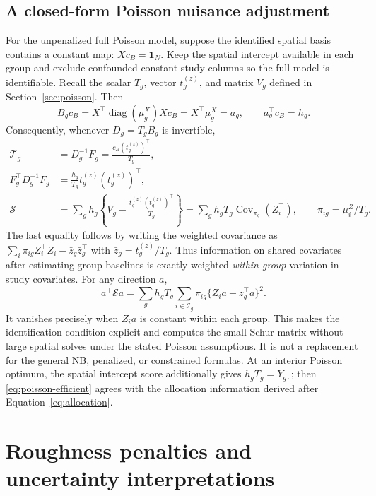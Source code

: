 \documentclass[11pt,a4paper]{article}
\newcommand{\Cov}{\operatorname{Cov}}
\newcommand{\diag}{\operatorname{diag}}
\numberwithin{equation}{section}
\begin{document}
\subsection{A closed-form Poisson nuisance adjustment}
For the unpenalized full Poisson model, suppose the identified spatial
basis contains a constant map: $Xc_B=\mathbf1_N$.
Keep the spatial intercept available in each group and exclude
confounded constant study columns so the full model is identifiable.
Recall the scalar $T_g$, vector $t_g^{(z)}$, and matrix $V_g$
defined in Section~\ref{sec:poisson}. Then
\[
 B_gc_B=X^\top\diag(\mu_g^X)Xc_B
       =X^\top\mu_g^X=a_g,\qquad a_g^\top c_B=h_g.
\]
Consequently, whenever $D_g=T_gB_g$ is invertible,
\begin{align}
 \mathcal T_g
 &=D_g^{-1}F_g
   =\frac{c_B(t_g^{(z)})^\top}{T_g},\\
 F_g^\top D_g^{-1}F_g
 &=\frac{h_g}{T_g}t_g^{(z)}(t_g^{(z)})^\top,\\
 \mathcal S
 &=\sum_g h_g\left\{V_g-
       \frac{t_g^{(z)}(t_g^{(z)})^\top}{T_g}\right\}
   =\sum_g h_gT_g\Cov_{\pi_g}(Z_i^\top),
 \qquad \pi_{ig}=\mu_i^Z/T_g .
 \label{eq:poisson-efficient}
\end{align}
The last equality follows by writing the weighted covariance as
$\sum_i\pi_{ig}Z_i^\top Z_i-\bar z_g\bar z_g^\top$ with
$\bar z_g=t_g^{(z)}/T_g$.
Thus information on shared covariates after estimating group baselines
is exactly weighted \emph{within-group} variation in study covariates.
For any direction $a$,
\[
 a^\top\mathcal S a
  =\sum_g h_gT_g\sum_{i\in\mathcal I_g}
      \pi_{ig}\{Z_i a-\bar z_g^\top a\}^2.
\]
It vanishes precisely when $Z_i a$ is constant within each group.
This makes the identification condition explicit and computes the
small Schur matrix without large spatial solves under the stated
Poisson assumptions.
It is not a replacement for the general NB, penalized, or constrained
formulas.
At an interior Poisson optimum, the spatial intercept score additionally
gives $h_gT_g=Y_{g\cdot}$; then \eqref{eq:poisson-efficient} agrees
with the allocation information derived after Equation~\eqref{eq:allocation}.

\section{Roughness penalties and uncertainty interpretations}\label{sec:penalty}
\end{document}
